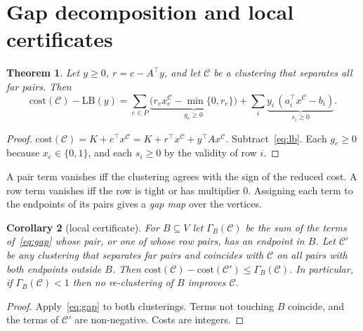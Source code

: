 \documentclass[11pt]{article}
\newtheorem{theorem}{Theorem}
\newtheorem{corollary}[theorem]{Corollary}
\theoremstyle{definition}
\newcommand{\cost}{\mathrm{cost}}
\newcommand{\LB}{\mathrm{LB}}
\begin{document}
\section{Gap decomposition and local certificates}\label{sec:gap}

\begin{theorem}\label{thm:gap}
Let $y\ge0$, $r=c-A^\top y$, and let $\mathcal C$ be a clustering that separates all
far pairs.  Then
\begin{equation}\label{eq:gap}
\cost(\mathcal C)-\LB(y)=\sum_{e\in P}\underbrace{\big(r_ex^{\mathcal C}_e-\min\{0,r_e\}\big)}_{g_e\ge0}
+\sum_i\underbrace{y_i\,(a_i^\top x^{\mathcal C}-b_i)}_{s_i\ge0}.
\end{equation}
\end{theorem}
\begin{proof}
$\cost(\mathcal C)=K+c^\top x^{\mathcal C}=K+r^\top x^{\mathcal C}+y^\top
Ax^{\mathcal C}$.  Subtract~\eqref{eq:lb}.  Each $g_e\ge0$ because
$x_e\in\{0,1\}$, and each $s_i\ge0$ by the validity of row $i$.
\end{proof}

A pair term vanishes iff the clustering agrees with the sign of the reduced
cost.  A row term vanishes iff the row is tight or has multiplier $0$.
Assigning each term to the endpoints of its pairs gives a \emph{gap map} over
the vertices.

\begin{corollary}[local certificate]\label{cor:local}
For $B\subseteq V$ let $\Gamma_B(\mathcal C)$ be the sum of the terms
of~\eqref{eq:gap} whose pair, or one of whose row pairs, has an endpoint in
$B$.  Let $\mathcal C'$ be any clustering that separates far pairs and
coincides with $\mathcal C$ on all pairs with both endpoints outside $B$.  Then
$\cost(\mathcal C)-\cost(\mathcal C')\le\Gamma_B(\mathcal C)$.  In particular,
if $\Gamma_B(\mathcal C)<1$ then no re-clustering of $B$ improves $\mathcal C$.
\end{corollary}
\begin{proof}
Apply~\eqref{eq:gap} to both clusterings.  Terms not touching $B$ coincide,
and the terms of $\mathcal C'$ are non-negative.  Costs are integers.
\end{proof}
\end{document}
